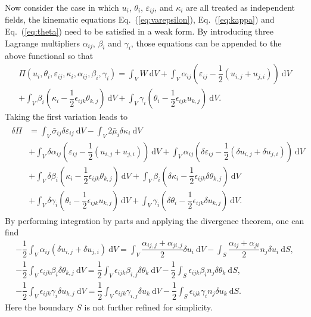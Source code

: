 \documentclass[3p,sort&compress,11pt,fleqn,review]{elsarticle}
\newcommand*{\eqsref}[1]{Eq.~(\ref{#1})}
\newcommand*{\md}[1]{\mathrm{d}#1}
\begin{document}
Now consider the case in which $u_i$, $\theta_i$, $\varepsilon_{ij}$, and $\kappa_i$ are all treated as independent fields, the kinematic equations \eqsref{eq:varepsilon}, \eqsref{eq:kappa} and \eqsref{eq:theta} need to be satisfied in a weak form. By introducing three Lagrange multipliers $\alpha_{ij}$, $\beta_i$ and $\gamma_i$, those equations can be appended to the above functional so that
\begin{multline}
\varPi\left(u_i,\theta_i,\varepsilon_{ij},\kappa_i,\alpha_{ij},\beta_i,\gamma_i\right)=\int_VW~\md{V}
+\int_V\alpha_{ij}\left(\varepsilon_{ij}-\dfrac{1}{2}\left(u_{i,j}+u_{j,i}\right)\right)~\md{V}\\
+\int_V\beta_i\left(\kappa_i-\dfrac{1}{2}\epsilon_{ijk}\theta_{k,j}\right)~\md{V}
+\int_V\gamma_i\left(\theta_i-\dfrac{1}{2}\epsilon_{ijk}u_{k,j}\right)~\md{V}.
\end{multline}
Taking the first variation leads to
\begin{gather}\label{eq:variation}
\begin{split}
\delta\varPi&=
\int_V\bar{\sigma}_{ij}\delta\varepsilon_{ij}~\md{V}
-\int_V2\bar{\mu}_{i}\delta\kappa_i~\md{V}\\&
+\int_V\delta{}\alpha_{ij}\left(\varepsilon_{ij}-\dfrac{1}{2}\left(u_{i,j}+u_{j,i}\right)\right)~\md{V}
+\int_V\alpha_{ij}\left(\delta{}\varepsilon_{ij}-\dfrac{1}{2}\left(\delta{}u_{i,j}+\delta{}u_{j,i}\right)\right)~\md{V}\\&
+\int_V\delta{}\beta_i\left(\kappa_i-\dfrac{1}{2}\epsilon_{ijk}\theta_{k,j}\right)~\md{V}
+\int_V\beta_i\left(\delta{}\kappa_i-\dfrac{1}{2}\epsilon_{ijk}\delta{}\theta_{k,j}\right)~\md{V}\\&
+\int_V\delta{}\gamma_i\left(\theta_i-\dfrac{1}{2}\epsilon_{ijk}u_{k,j}\right)~\md{V}
+\int_V\gamma_i\left(\delta{}\theta_i-\dfrac{1}{2}\epsilon_{ijk}\delta{}u_{k,j}\right)~\md{V}.
\end{split}
\end{gather}
By performing integration by parts and applying the divergence theorem, one can find
\begin{gather}
-\dfrac{1}{2}\int_V\alpha_{ij}\left(\delta{}u_{i,j}+\delta{}u_{j,i}\right)~\md{V}=\int_V\dfrac{\alpha_{ij,j}+\alpha_{ji,j}}{2}\delta{}u_i~\md{V}-\int_S\dfrac{\alpha_{ij}+\alpha_{ji}}{2}n_j\delta{}u_i~\md{S},\\
-\dfrac{1}{2}\int_V\epsilon_{ijk}\beta_i\delta\theta_{k,j}~\md{V}=\dfrac{1}{2}\int_V\epsilon_{ijk}\beta_{i,j}\delta\theta_k~\md{V}-\dfrac{1}{2}\int_S\epsilon_{ijk}\beta_in_j\delta\theta_k~\md{S},\\
-\dfrac{1}{2}\int_V\epsilon_{ijk}\gamma_i\delta{}u_{k,j}~\md{V}=\dfrac{1}{2}\int_V\epsilon_{ijk}\gamma_{i,j}\delta{}u_k~\md{V}-\dfrac{1}{2}\int_S\epsilon_{ijk}\gamma_in_j\delta{}u_k~\md{S}.
\end{gather}
Here the boundary $S$ is not further refined for simplicity.
\end{document}
